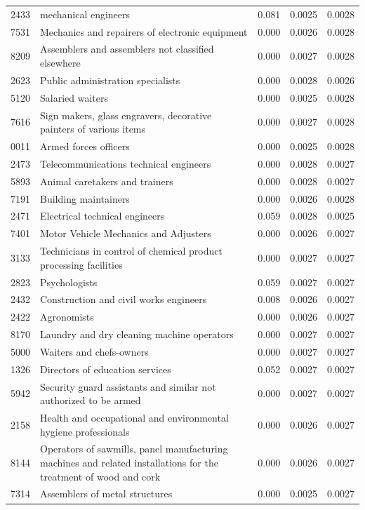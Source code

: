 \begin{longtable}{p{}>{\raggedright\arraybackslash}p{}rrr}
2433 & mechanical engineers & 0.081 & 0.0025 & 0.0028 \\
7531 & Mechanics and repairers of electronic equipment & 0.000 & 0.0026 & 0.0028 \\
8209 & Assemblers and assemblers not classified elsewhere & 0.000 & 0.0027 & 0.0028 \\
2623 & Public administration specialists & 0.000 & 0.0028 & 0.0026 \\
5120 & Salaried waiters & 0.000 & 0.0025 & 0.0028 \\
7616 & Sign makers, glass engravers, decorative painters of various items & 0.000 & 0.0027 & 0.0028 \\
0011 & Armed forces officers & 0.000 & 0.0025 & 0.0028 \\
2473 & Telecommunications technical engineers & 0.000 & 0.0028 & 0.0027 \\
5893 & Animal caretakers and trainers & 0.000 & 0.0028 & 0.0027 \\
7191 & Building maintainers & 0.000 & 0.0026 & 0.0028 \\
2471 & Electrical technical engineers & 0.059 & 0.0028 & 0.0025 \\
7401 & Motor Vehicle Mechanics and Adjusters & 0.000 & 0.0026 & 0.0027 \\
3133 & Technicians in control of chemical product processing facilities & 0.000 & 0.0027 & 0.0027 \\
2823 & Psychologists & 0.059 & 0.0027 & 0.0027 \\
2432 & Construction and civil works engineers & 0.008 & 0.0026 & 0.0027 \\
2422 & Agronomists & 0.000 & 0.0026 & 0.0027 \\
8170 & Laundry and dry cleaning machine operators & 0.000 & 0.0027 & 0.0027 \\
5000 & Waiters and chefs-owners & 0.000 & 0.0027 & 0.0027 \\
1326 & Directors of education services & 0.052 & 0.0027 & 0.0027 \\
5942 & Security guard assistants and similar not authorized to be armed & 0.000 & 0.0027 & 0.0027 \\
2158 & Health and occupational and environmental hygiene professionals & 0.000 & 0.0026 & 0.0027 \\
8144 & Operators of sawmills, panel manufacturing machines and related installations for the treatment of wood and cork & 0.000 & 0.0026 & 0.0027 \\
7314 & Assemblers of metal structures & 0.000 & 0.0025 & 0.0027 \\

\end{longtable}
